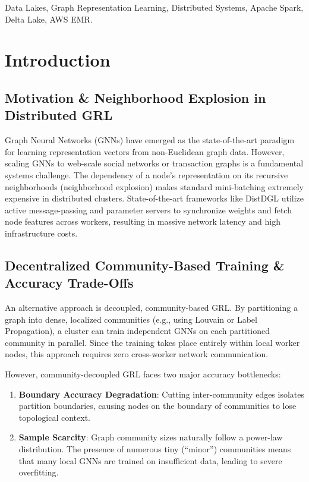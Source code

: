 \documentclass[conference,compsoc]{IEEEtran}
\begin{document}
\begin{IEEEkeywords}
Data Lakes, Graph Representation Learning, Distributed Systems, Apache Spark, Delta Lake, AWS EMR.
\end{IEEEkeywords}

\IEEEpeerreviewmaketitle

\section{Introduction}
\subsection{Motivation \& Neighborhood Explosion in Distributed GRL}
Graph Neural Networks (GNNs) have emerged as the state-of-the-art paradigm for learning representation vectors from non-Euclidean graph data. However, scaling GNNs to web-scale social networks or transaction graphs is a fundamental systems challenge. The dependency of a node's representation on its recursive neighborhoods (neighborhood explosion) makes standard mini-batching extremely expensive in distributed clusters. State-of-the-art frameworks like DistDGL utilize active message-passing and parameter servers to synchronize weights and fetch node features across workers, resulting in massive network latency and high infrastructure costs.

\subsection{Decentralized Community-Based Training \& Accuracy Trade-Offs}
An alternative approach is decoupled, community-based GRL. By partitioning a graph into dense, localized communities (e.g., using Louvain or Label Propagation), a cluster can train independent GNNs on each partitioned community in parallel. Since the training takes place entirely within local worker nodes, this approach requires zero cross-worker network communication. 

However, community-decoupled GRL faces two major accuracy bottlenecks:
\begin{enumerate}
    \item \textbf{Boundary Accuracy Degradation}: Cutting inter-community edges isolates partition boundaries, causing nodes on the boundary of communities to lose topological context.
    \item \textbf{Sample Scarcity}: Graph community sizes naturally follow a power-law distribution. The presence of numerous tiny (``minor'') communities means that many local GNNs are trained on insufficient data, leading to severe overfitting.
\end{enumerate}
\end{document}
